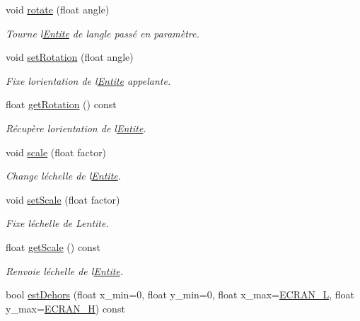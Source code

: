 \begin{DoxyCompactItemize}
void \hyperlink{class_entite_af1249039d313e4e691a109440663eae7}{rotate} (float angle)
\begin{DoxyCompactList}\small\item\em Tourne l\textquotesingle{}\hyperlink{class_entite}{Entite} de l\textquotesingle{}angle passé en paramètre. \end{DoxyCompactList}\item 
void \hyperlink{class_entite_a8623ac815e34b553098f45696ea8918b}{set\+Rotation} (float angle)
\begin{DoxyCompactList}\small\item\em Fixe l\textquotesingle{}orientation de l\textquotesingle{}\hyperlink{class_entite}{Entite} appelante. \end{DoxyCompactList}\item 
float \hyperlink{class_entite_a7f19439f7e7a5028f4b26eff21683de9}{get\+Rotation} () const
\begin{DoxyCompactList}\small\item\em Récupère l\textquotesingle{}orientation de l\textquotesingle{}\hyperlink{class_entite}{Entite}. \end{DoxyCompactList}\item 
void \hyperlink{class_entite_a770f6c53856606c4de768bb942299659}{scale} (float factor)
\begin{DoxyCompactList}\small\item\em Change l\textquotesingle{}échelle de l\textquotesingle{}\hyperlink{class_entite}{Entite}. \end{DoxyCompactList}\item 
void \hyperlink{class_entite_a665939253829baba965ce3ead0f1739c}{set\+Scale} (float factor)
\begin{DoxyCompactList}\small\item\em Fixe l\textquotesingle{}échelle de L\textquotesingle{}entite. \end{DoxyCompactList}\item 
float \hyperlink{class_entite_a5f70868f62049291edf4b245a531a6e0}{get\+Scale} () const
\begin{DoxyCompactList}\small\item\em Renvoie l\textquotesingle{}échelle de l\textquotesingle{}\hyperlink{class_entite}{Entite}. \end{DoxyCompactList}\item 
bool \hyperlink{class_entite_a3e3abd5eac22335f388e6b31675319c1}{est\+Dehors} (float x\+\_\+min=0, float y\+\_\+min=0, float x\+\_\+max=\hyperlink{constantes_8h_a078285dfdd5f8d9caa79aeb3f4eb0a1f}{E\+C\+R\+A\+N\+\_\+L}, float y\+\_\+max=\hyperlink{constantes_8h_a75c426da06c2ec9164baaf36a262fa07}{E\+C\+R\+A\+N\+\_\+H}) const

\end{DoxyCompactItemize}
